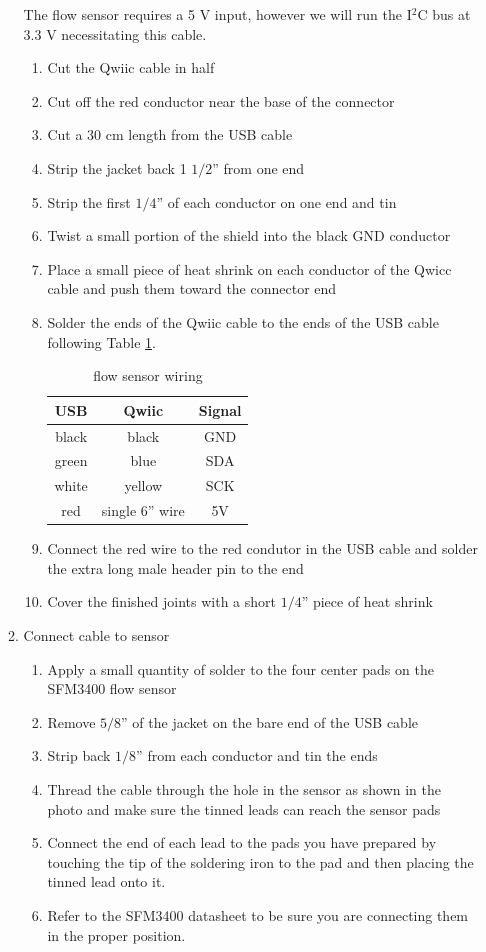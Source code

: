 \documentclass[11pt, letterpaper]{article}
\begin{document}
\begin{enumerate}
\begin{enumerate}[label=4.\arabic*]
The flow sensor requires a 5 V input, however we will run the I$^2$C bus at 3.3 V necessitating this cable. 
\\
\begin{enumerate}[label=4.1.\arabic*]
\item
Cut the Qwiic cable in half
\item
Cut off the red conductor near the base of the connector
\item
Cut a 30 cm length from the USB cable
\item
Strip the jacket back 1 $1/2$'' from one end
\item
Strip the first $1/4$'' of each conductor on one end and tin
\item
Twist a small portion of the shield into the black GND conductor
\item
Place a small piece of heat shrink on each conductor of the Qwicc cable and push them toward the connector end
\item
Solder the ends of the Qwiic cable to the ends of the USB cable following Table \ref{tab:flow}.
\begin{table}[H]
\centering
\begin{tabular}{| c | c | c |}
\hline
USB & Qwiic & Signal \\  \hline
black & black & GND \\  \hline
green & blue & SDA \\  \hline
white & yellow & SCK \\  \hline
red & single 6'' wire & 5V \\  
\hline
\end{tabular}
\caption{flow sensor wiring}
\label{tab:flow}
\end{table}
\item
Connect the red wire to the red condutor in the USB cable and solder the extra long male header pin to the end
\item
Cover the finished joints with a short $1/4$'' piece of heat shrink
\end{enumerate}

\item
Connect cable to sensor

\begin{enumerate}[label=4.2.\arabic*]
\item
Apply a small quantity of solder to the four center pads on the SFM3400 flow sensor
\item
Remove $5/8$'' of the jacket on the bare end of the USB cable
\item
Strip back $1/8$'' from each conductor and tin the ends
\item
Thread the cable through the hole in the sensor as shown in the photo and make sure the tinned leads can reach the sensor pads
\item
Connect the end of each lead to the pads you have prepared by touching the tip of the soldering iron to the pad and then placing the tinned lead onto it.
\item
Refer to the SFM3400 datasheet to be sure you are connecting them in the proper position.
\end{enumerate}


\end{enumerate}
\end{enumerate}
\end{document}
